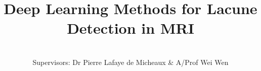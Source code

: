 %
%
% 
%



%
%

% 
%

\title{Deep Learning Methods for Lacune Detection in MRI}


\author{\Authornameonly\\{\bigskip}Supervisors: Dr Pierre Lafaye de Micheaux \& A/Prof Wei Wen}


\copyrightfalse
\figurespagefalse
\tablespagefalse

%
%





\afterpreface

%
%






























